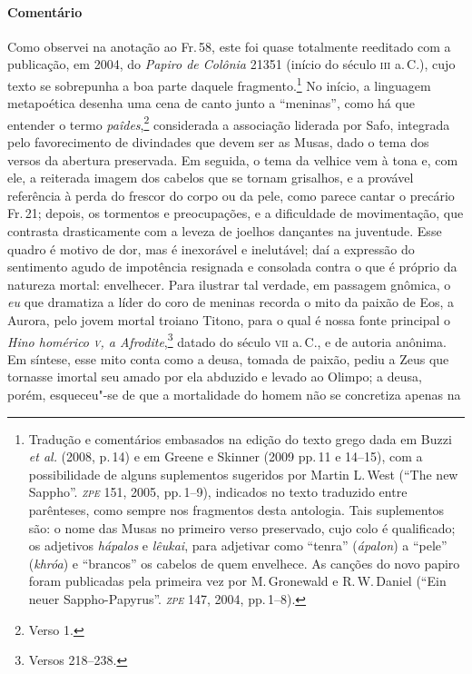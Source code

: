 {\paragraph{Comentário} Como observei na anotação ao Fr.\,58, este foi quase totalmente reeditado com a 
publicação, em 2004, do \emph{Papiro de Colônia} 21351 (início do século \textsc{iii} a.\,C.), 
cujo texto se sobrepunha a boa parte daquele fragmento.\footnote{Tradução e comentários embasados na edição do texto grego dada em Buzzi \emph{et al.} (2008, p.\,14) e em Greene e Skinner (2009 pp.\,11 e 14--15), com a possibilidade de alguns suplementos sugeridos por Martin L.\,West (``The new Sappho''. \emph{\textsc{zpe}} 151, 2005, pp.\,1--9), indicados no texto traduzido entre parênteses, como sempre nos fragmentos desta antologia. Tais suplementos são: o nome das Musas no primeiro verso preservado, cujo colo é qualificado; os adjetivos \emph{hápalos} e \emph{lêukai}, para adjetivar como ``tenra'' (\emph{ápalon}) a ``pele'' (\emph{khróa}) e ``brancos'' os cabelos de quem envelhece. As canções do novo papiro foram publicadas pela primeira vez por M.\,Gronewald e R.\,W.\,Daniel (``Ein neuer Sappho-Papyrus''. \emph{\textsc{zpe}} 147, 2004, pp.\,1--8).} No início, a 
linguagem metapoética desenha uma cena de canto junto a ``meninas'', como há que entender o termo \emph{paîdes},\footnote{Verso 1.} considerada a associação liderada por Safo, 
integrada pelo favorecimento de divindades que devem ser as Musas,
dado o tema dos versos da abertura preservada. Em seguida, o tema da velhice
vem à tona e, com ele, a reiterada imagem dos cabelos que se tornam grisalhos,
e a provável referência à perda do frescor do corpo ou da pele, como parece cantar o precário Fr.\,21; depois, os
tormentos e preocupações, e a dificuldade de movimentação, que contrasta
drasticamente com a leveza de joelhos dançantes na juventude. Esse quadro é
motivo de dor, mas é inexorável e inelutável; daí a expressão do sentimento
agudo de impotência resignada e consolada contra o que é próprio da natureza mortal: envelhecer. Para
ilustrar tal verdade, em passagem gnômica, o \emph{eu} que dramatiza a líder do coro de meninas recorda o
mito da paixão de Eos, a Aurora, pelo jovem mortal troiano Titono, para o qual é nossa fonte
principal o \emph{Hino homérico \textsc{v}, a Afrodite},\footnote{Versos 218--238.} datado do
século \textsc{vii} a.\,C., e de autoria anônima. Em síntese, esse mito conta como a
deusa, tomada de paixão, pediu a Zeus que tornasse imortal seu amado por ela abduzido e levado ao Olimpo; a deusa,
porém, esqueceu"-se de que a mortalidade do homem não se concretiza apenas na
}
